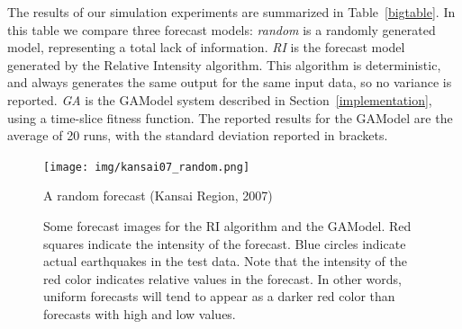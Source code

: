 \documentclass{sig-alternate}
\begin{document}
The results of our simulation experiments are summarized in
Table~\ref{bigtable}. In this table we compare three forecast models:
\emph{random} is a randomly generated model, representing a total lack
of information. \emph{RI} is the forecast model generated by the
Relative Intensity algorithm. This algorithm is deterministic, and
always generates the same output for the same input data, so no
variance is reported. \emph{GA} is the GAModel system described in
Section~\ref{implementation}, using a time-slice fitness function. The
reported results for the GAModel are the average of 20 runs, with the
standard deviation reported in brackets.




\begin{figure}
  \begin{center}
    \texttt{[image: img/kansai07\_random.png]}
  \end{center}
  \caption{A random forecast (Kansai Region, 2007)}
  \label{randomforecast}
\end{figure}

\begin{figure}

  \begin{center}
    

    
  \end{center}
  \caption{Some forecast images for the RI algorithm and the
    GAModel. Red squares indicate the intensity of the forecast. Blue
    circles indicate actual earthquakes in the test data. Note that
    the intensity of the red color indicates relative values in the
    forecast. In other words, uniform forecasts will tend to appear as
    a darker red color than forecasts with high and low values.}
  \label{fig:results}
\end{figure}
\end{document}
